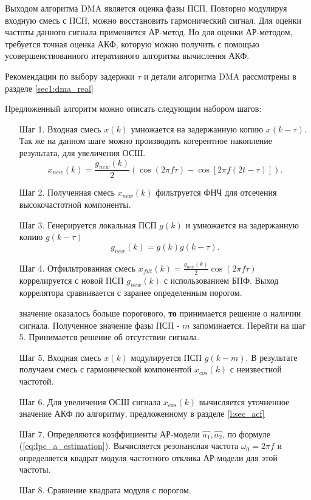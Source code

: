 Выходом алгоритма DMA является оценка фазы ПСП. Повторно модулируя входную смесь с ПСП, можно восстановить гармонический сигнал. Для оценки частоты данного сигнала применяется
АР-метод. Но для оценки АР-методом, требуется точная оценка АКФ, которую можно получить
с помощью усовершенствованного итеративного алгоритма вычисления АКФ.

Рекомендации по выбору задержки ${\tau}$ и детали алгоритма DMA рассмотрены в разделе \ref{sec1:dma_real}

Предложенный алгоритм можно описать следующим набором шагов:
\begin{itemize}[align=left,style=nextline,leftmargin=*,labelsep=\parindent,font=\normalfont]
\item[Шаг 1.] Входная смесь ${x(k)}$ умножается на задержанную копию ${x(k-\tau)}$. Так же
	на данном шаге можно производить когерентное накопление результата, для
	увеличения ОСШ.
	\begin{equation}
		x_{new}(k) = \frac{g_{new}(k)}{2} \left(\cos (2\pi f \tau) - \cos \left[2 \pi f (2t - \tau)\right]\right).
	\end{equation}

\item[Шаг 2.] Полученная смесь ${x_{new}(k)}$ фильтруется ФНЧ для отсечения высокочастотной компоненты.
\item[Шаг 3.] Генерируется локальная ПСП ${g(k)}$ и умножается на задержанную копию ${g(k-\tau)}$
	\begin{equation}
		g_{new}(k) = g(k)g(k-\tau).
	\end{equation}

\item[Шаг 4.] Отфильтрованная смесь ${x_{filt}(k) = \frac{g_{new}(k)}{2} \cos (2\pi f \tau)}$ коррелируется с новой ПСП ${g_{new}(k)}$
	с использованием БПФ. Выход коррелятора сравнивается с заранее определенным порогом.

	  значение оказалось больше порогового, {\bf{то}}
		принимается решение о наличии сигнала. Полученное значение фазы ПСП  - ${m}$ запоминается.
		Перейти на шаг 5.
		Принимается решение об отсутствии сигнала.
\item[Шаг 5.] Входная смесь ${x(k)}$ модулируется ПСП ${g(k-m)}$. В результате получаем смесь с гармонической компонентой 
	${x_{cos}(k)}$ с неизвестной частотой.
\item[Шаг 6.] Для увеличения ОСШ сигнала ${x_{cos}(k)}$ вычисляется уточненное значение АКФ
	по алгоритму, предложенному в разделе \ref{l:sec_acf}
\item[Шаг 7.] Определяются коэффициенты АР-модели ${\hat{a_1}, \hat{a_2}}$, по формуле \mbox{(\ref{eq:lpc_a_estimation}).} 
	Вычисляется резонансная частота ${\omega_0 = 2 \pi f}$ и определяется квадрат модуля частотного отклика АР-модели для этой частоты. 
\item[Шаг 8.] Сравнение квадрата модуля с порогом.


\end{itemize}
